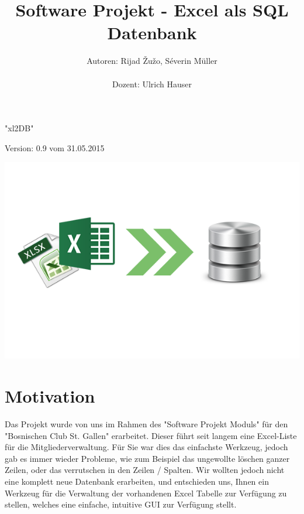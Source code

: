 \documentclass{article}
\begin{document}
\begin{titlepage}


\title{\vspace{20mm}\Huge Software Projekt - Excel als SQL Datenbank}
\author{Autoren: Rijad \v{Z}u\v{z}o, Séverin Müller \\ \\ Dozent: Ulrich Hauser}



\date{} 
\clearpage\maketitle
\thispagestyle{empty}

\vspace{60mm}
\centering \huge "xl2DB"

\centering \normalsize Version: 0.9 vom 31.05.2015
\begin{center}
		\includegraphics[width=0.8 \textwidth]{SoftwareLogo}
\end{center}

\end{titlepage}
\newpage
\tableofcontents
\vspace{-5mm}
\listoffigures
\newpage



\section{Motivation}
Das Projekt wurde von uns im Rahmen des "Software Projekt Moduls" für den "Bosnischen Club St. Gallen" erarbeitet. Dieser führt seit langem eine Excel-Liste für die Mitgliederverwaltung. \newline 
Für Sie war dies das einfachste Werkzeug, jedoch gab es immer wieder Probleme, wie zum Beispiel das ungewollte löschen ganzer Zeilen, oder das verrutschen in den Zeilen / Spalten. Wir wollten jedoch nicht eine komplett neue Datenbank erarbeiten, und entschieden uns, Ihnen ein Werkzeug für die Verwaltung der vorhandenen Excel Tabelle zur Verfügung zu stellen, welches eine einfache, intuitive GUI zur Verfügung stellt.
\end{document}
